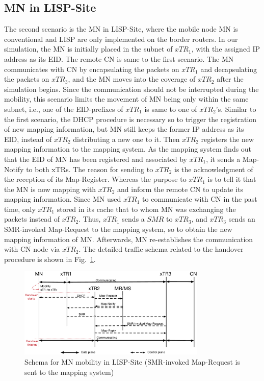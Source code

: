 \subsection{MN in LISP-Site}
\label{sec:ns3_analysis_xTR}
The second scenario is the MN in LISP-Site, where the mobile node MN is conventional and LISP are only implemented on the border routers. In our simulation, the MN is initially placed in the subnet of $xTR_1$, with the assigned IP address as its EID. The remote CN is same to the first scenario. The MN communicates with CN by encapsulating the packets on $xTR_1$ and decapsulating the packets on $xTR_3$, and the MN moves into the coverage of $xTR_2$ after the simulation begins. Since the communication should not be interrupted during the mobility, this scenario limits the movement of MN being only within the same subnet, i.e., one of the EID-prefixes of $xTR_1$ is same to one of $xTR_2$'s. %
Similar to the first scenario, the DHCP procedure is necessary so to trigger the registration of new mapping information, but MN still keeps the former IP address as its EID, instead of $xTR_2$ distributing a new one to it. Then $xTR_2$ registers the new mapping information to the mapping system. As the mapping system finds out that the EID of MN has been registered and associated by $xTR_1$, it sends a Map-Notify to both xTRs. The reason for sending to $xTR_2$ is the acknowledgment of the reception of its Map-Register. Whereas the purpose to $xTR_1$ is to tell it that the MN is now mapping with $xTR_2$ and inform the remote CN to update its mapping information. Since MN used $xTR_1$ to communicate with CN in the past time, only $xTR_1$ stored in its cache that to whom MN was exchanging the packets instead of $xTR_2$. Thus, $xTR_1$ sends a $SMR$ to $xTR_3$, and $xTR_3$ sends an SMR-invoked Map-Request to the mapping system, so to obtain the new mapping information of MN. Afterwards, MN re-establishes the communication with CN node via $xTR_2$. The detailed traffic schema related to the handover procedure is shown in Fig.~\ref{sim_schema_xTR}.
\begin{figure}[!t]
	\centering
	\includegraphics[width=0.8\textwidth]{Pics/Mobility_xTR_schema_SMR_simplify}
	\caption{Schema for MN mobility in LISP-Site (SMR-invoked Map-Request is sent to the mapping system)}
	\label{sim_schema_xTR}
\end{figure}
